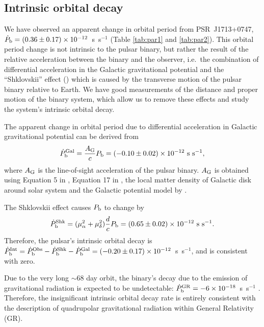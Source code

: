 \subsection{Intrinsic orbital decay}
\label{sec:obdecay}
We have observed an apparent change in orbital period from PSR~J1713+0747, $\dot{P}_{\rm b} =
(0.36\pm0.17)\times10^{-12}$~s~s$^{-1}$ (Table \ref{tab:par1} and \ref{tab:par2}).
This orbital period change is not intrinsic to the pulsar binary, but rather the
result of the relative acceleration between the binary and the
observer, i.e.~the combination of differential acceleration in the Galactic gravitational potential
\citep{dt91} and the ``Shklovskii'' effect (\citealt{shk70}) which is caused
by the transverse motion of the pulsar binary relative to Earth. We have good measurements of the distance and proper
motion of the binary system, which allow us to remove these effects and study the system's intrinsic orbital decay.

The apparent change in orbital period due to differential acceleration in
Galactic gravitational potential can be derived from
\begin{equation}
\dot{P}_{\rm b}^{\rm Gal} = \frac{A_{\rm G}}{c} P_{\rm b} =
(-0.10\pm0.02)\times10^{-12}~{\rm s~s^{-1}},
\end{equation}
where $A_{\rm G}$ is the line-of-sight acceleration of the pulsar binary.
$A_{\rm G}$ is obtained using
Equation 5 in \citet{nt95}, Equation 17 in \citet{lwj+09}, the
local matter density of Galactic disk around solar system \citep{hf04a}
and the Galactic potential model by \citet{rmb+14}.

The Shklovskii effect causes $P_{\rm b}$ to
change by
\begin{equation}
\dot{P}_{\rm b}^{\rm Shk} = (\mu_{\alpha}^2+\mu_{\delta}^2)\frac{d}{c}P_{\rm
b} = (0.65\pm0.02)\times10^{-12}~{\rm s~s^{-1}}.
\end{equation}
Therefore, the pulsar's intrinsic orbital decay is $\dot{P}_{\rm b}^{\rm Int}
= \dot{P}_{\rm b}^{\rm Obs} - \dot{P}_{\rm b}^{\rm Shk} - \dot{P}_{\rm b}^{\rm
Gal} = (-0.20\pm0.17)\times10^{-12}$~s~s$^{-1}$, and is consistent with zero.

Due to the very long $\sim$68 day orbit, the binary's decay due to the
emission of gravitational
radiation is expected to be undetectable: $\dot{P}_{\rm b}^{\rm GR} =
-6\times10^{-18}$~s~s$^{-1}$ \citep{lk05}.  Therefore, the insignificant
intrinsic orbital decay rate is entirely consistent with the
description of quadrupolar gravitational radiation within General
Relativity (GR).

